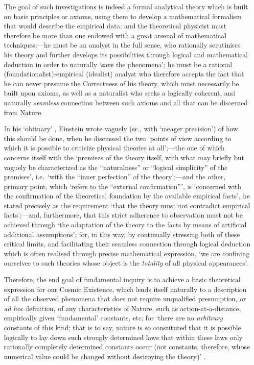 The goal of such investigations is indeed a formal analytical theory which is built on basic principles or axioms, using them to develop a mathematical formalism that would describe the empirical data; and the theoretical physicist must therefore be more than one endowed with a great arsenal of mathematical techniques:---he must be an analyst in the full sense, who rationally scrutinises his theory and further develops its possibilities through logical and mathematical deduction in order to naturally `save the phenomena'; he must be a rational (foundationalist)-empirical (idealist) analyst who therefore accepts the fact that he can never presume the Correctness of his theory, which must necessarily be built upon axioms, as well as a naturalist who seeks a logically coherent, and naturally \textit{seamless} connection between such axioms and all that can be discerned from Nature.

In his `obituary' \cite{Einstein1951}, Einstein wrote vaguely (sc., with `meager precision') of how this should be done, when he discussed the two `points of view according to which it is possible to criticize physical theories at all';---the one of which concerns itself with the `premises of the theory itself, with what may briefly but vaguely be characterized as the ``naturalness'' or ``logical simplicity'' of the premises', i.e.~`with the ``inner perfection'' of the theory';---and the other, primary point, which `refers to the ``external confirmation{''}', is `concerned with the confirmation of the theoretical foundation by the available empirical facts', he stated precisely as the requirement `that the theory must not contradict empirical facts';---and, furthermore, that this strict adherence to observation must not be achieved through `the adaptation of the theory to the facts by means of artificial additional assumptions'; for, in this way, by continually stressing both of these critical limits, and facilitating their seamless connection through logical deduction which is often realised through precise mathematical expression, `we are confining ourselves to such theories whose object is the \textit{totality} of all physical appearances'.

Therefore, the end goal of fundamental inquiry is to achieve a basic theoretical expression for our Cosmic Existence, which lends itself naturally to a description of all the observed phenomena that does not require unqualified presumption, or \textit{ad hoc} definition, of any characteristics of Nature, such as action-at-a-distance, empirically given `fundamental' constants, etc; for `there are no \textit{arbitrary} constants of this kind; that is to say, nature is so constituted that it is possible logically to lay down such strongly determined laws that within these laws only rationally completely determined constants occur (not constants, therefore, whose numerical value could be changed without destroying the theory)' \cite{Einstein1951}.

